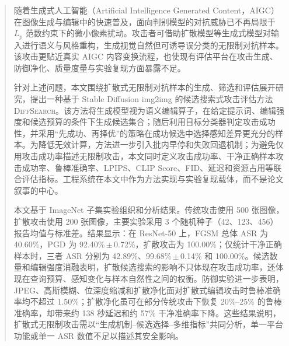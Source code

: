 \documentclass[type=bachelor,oneside]{fduthesis}
\newcommand{\methodname}{\textsc{DiffSearch}}
\begin{document}
\frontmatter

\tableofcontents

\begin{abstract}
随着生成式人工智能（Artificial Intelligence Generated Content，AIGC）在图像生成与编辑中的快速普及，面向判别模型的对抗威胁已不再局限于 $L_p$ 范数约束下的微小像素扰动。攻击者可借助扩散模型等生成式模型对输入进行语义与风格重构，生成视觉自然但可诱导误分类的无限制对抗样本。该攻击更贴近真实 AIGC 内容变换流程，也使现有评估平台在攻击生成、防御净化、质量度量与实验复现方面暴露不足。

针对上述问题，本文围绕扩散式无限制对抗样本的生成、筛选和评估展开研究，提出一种基于 Stable Diffusion img2img 的候选搜索式攻击评估方法 \methodname。该方法将生成模型视为语义编辑算子，在给定提示词、编辑强度和候选预算的条件下生成候选集合；随后利用目标分类器判定攻击成功性，并采用“先成功、再择优”的策略在成功候选中选择感知差异更充分的样本。为降低无效计算，方法进一步引入批内早停和失败回退机制；为避免仅用攻击成功率描述无限制攻击，本文同时定义攻击成功率、干净正确样本攻击成功率、鲁棒准确率、LPIPS、CLIP Score、FID、延迟和资源占用等联合评估指标。工程系统在本文中作为方法实现与实验复现载体，而不是论文叙事的中心。

本文基于 ImageNet 子集实验组织和分析结果。传统攻击使用 500 张图像，扩散攻击使用 200 张图像，主要实验采用 3 个随机种子（42、123、456）报告均值与标准差。结果显示：在 ResNet-50 上，FGSM 总体 ASR 为 40.60\%，PGD 为 92.40\%\,$\pm$\,0.72\%，扩散攻击为 100.00\%；仅统计干净正确样本时，三者 ASR 分别为 42.89\%、99.68\%\,$\pm$\,0.14\% 和 100.00\%。候选数量和编辑强度消融表明，扩散候选搜索的影响不只体现在攻击成功率，还体现在查询预算、感知变化与样本自然性之间的权衡。防御实验进一步表明，JPEG、高斯模糊、位深度缩减和扩散净化面对扩散式编辑攻击时鲁棒准确率均不超过 1.50\%；扩散净化虽可在部分传统攻击下恢复 20\%--25\% 的鲁棒准确率，却带来约 138 秒延迟和约 57\% 干净准确率下降。这些结果说明，扩散式无限制攻击需以“生成机制--候选选择--多维指标”共同分析，单一平台功能或单一 ASR 数值不足以描述其安全影响。
\end{abstract}
\end{document}
